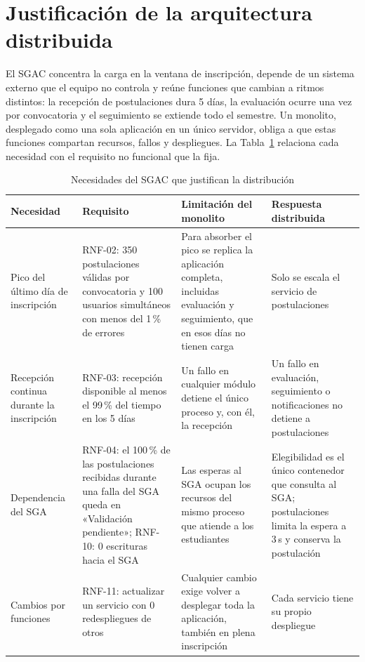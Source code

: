 \section{Justificación de la arquitectura distribuida}
\label{sec:justificacion-arquitectura}

El SGAC concentra la carga en la ventana de inscripción, depende de un sistema externo que el equipo no controla y reúne funciones que cambian a ritmos distintos: la recepción de postulaciones dura 5 días, la evaluación ocurre una vez por convocatoria y el seguimiento se extiende todo el semestre. Un monolito, desplegado como una sola aplicación en un único servidor, obliga a que estas funciones compartan recursos, fallos y despliegues. La Tabla~\ref{tab:justificacion} relaciona cada necesidad con el requisito no funcional que la fija.

\begin{table}[htbp]
  \centering
  \caption{Necesidades del SGAC que justifican la distribución}
  \label{tab:justificacion}
  \small
  \begin{tabularx}{\textwidth}{@{}>{\raggedright\arraybackslash}p{2.6cm}
                                  >{\raggedright\arraybackslash}X
                                  >{\raggedright\arraybackslash}X
                                  >{\raggedright\arraybackslash}X@{}}
    \toprule
    \textbf{Necesidad} & \textbf{Requisito} & \textbf{Limitación del monolito} & \textbf{Respuesta distribuida} \\
    \midrule
    Pico del último día de inscripción
      & RNF-02: 350 postulaciones válidas por convocatoria y 100 usuarios simultáneos con menos del 1\,\% de errores
      & Para absorber el pico se replica la aplicación completa, incluidas evaluación y seguimiento, que en esos días no tienen carga
      & Solo se escala el servicio de postulaciones \\
    \addlinespace
    Recepción continua durante la inscripción
      & RNF-03: recepción disponible al menos el 99\,\% del tiempo en los 5 días
      & Un fallo en cualquier módulo detiene el único proceso y, con él, la recepción
      & Un fallo en evaluación, seguimiento o notificaciones no detiene a postulaciones \\
    \addlinespace
    Dependencia del SGA
      & RNF-04: el 100\,\% de las postulaciones recibidas durante una falla del SGA queda en «Validación pendiente»; RNF-10: 0 escrituras hacia el SGA
      & Las esperas al SGA ocupan los recursos del mismo proceso que atiende a los estudiantes
      & Elegibilidad es el único contenedor que consulta al SGA; postulaciones limita la espera a 3\,s y conserva la postulación \\
    \addlinespace
    Cambios por funciones
      & RNF-11: actualizar un servicio con 0 redespliegues de otros
      & Cualquier cambio exige volver a desplegar toda la aplicación, también en plena inscripción
      & Cada servicio tiene su propio despliegue \\
    \bottomrule
  \end{tabularx}
\end{table}


